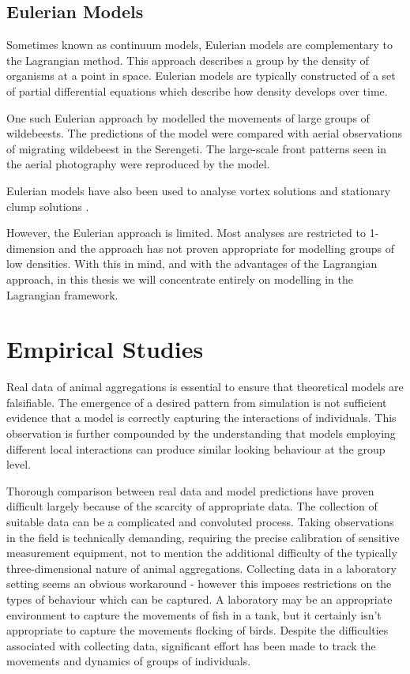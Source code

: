 \subsection{Eulerian Models}
\label{ssec:eulerian_models}

Sometimes known as continuum models, Eulerian models are complementary to the Lagrangian method. This approach describes a group by the density of organisms at a point in space. Eulerian models are typically constructed of a set of partial differential equations which describe how density develops over time.

One such Eulerian approach by \citet{gueron93} modelled the movements of large groups of wildebeests. The predictions of the model were compared with aerial observations of migrating wildebeest in the Serengeti. The large-scale front patterns seen in the aerial photography were reproduced by the model.

Eulerian models have also been used to analyse vortex solutions \citep{topaz04} and stationary clump solutions \citep{topaz06}.

However, the Eulerian approach is limited. Most analyses are restricted to 1-dimension and the approach has not proven appropriate for modelling groups of low densities. With this in mind, and with the advantages of the Lagrangian approach, in this thesis we will concentrate entirely on modelling in the Lagrangian framework.

\section{Empirical Studies}
\label{sec:empirical_studies}

Real data of animal aggregations is essential to ensure that theoretical models are falsifiable. The emergence of a desired pattern from simulation is not sufficient evidence that a model is correctly capturing the interactions of individuals. This observation is further compounded by the understanding that models employing different local interactions can produce similar looking behaviour at the group level.

Thorough comparison between real data and model predictions have proven difficult largely because of the scarcity of appropriate data. The collection of suitable data can be a complicated and convoluted process. Taking observations in the field is technically demanding, requiring the precise calibration of sensitive measurement equipment, not to mention the additional difficulty of the typically three-dimensional nature of animal aggregations. Collecting data in a laboratory setting seems an obvious workaround - however this imposes restrictions on the types of behaviour which can be captured. A laboratory may be an appropriate environment to capture the movements of fish in a tank, but it certainly isn't appropriate to capture the movements flocking of birds. Despite the difficulties associated with collecting data, significant effort has been made to track the movements and dynamics of groups of individuals.

